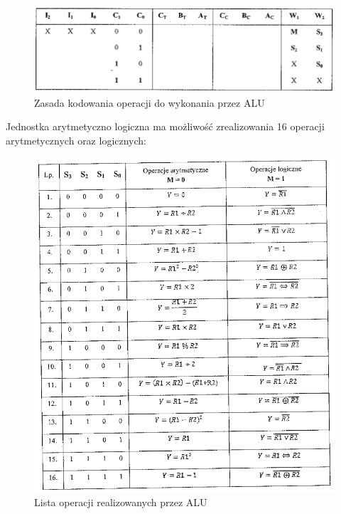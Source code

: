 \documentclass[../main.tex]{subfiles}
\begin{document}
        \begin{figure}[H]
            \centering
            \includegraphics[width=\linewidth]{kodowanie_alu.png}
            \caption{Zasada kodowania operacji do wykonania przez ALU}
            \label{fig:kodowanie_alu}
        \end{figure}

        Jednostka arytmetyczno logiczna ma możliwość zrealizowania 16 operacji arytmetycznych oraz logicznych:

        \begin{figure}[H]
            \centering
            \includegraphics[width=\linewidth]{operacje_alu.png}
            \caption{Lista operacji realizowanych przez ALU}
            \label{fig:operacje_alu}
        \end{figure}
\end{document}
